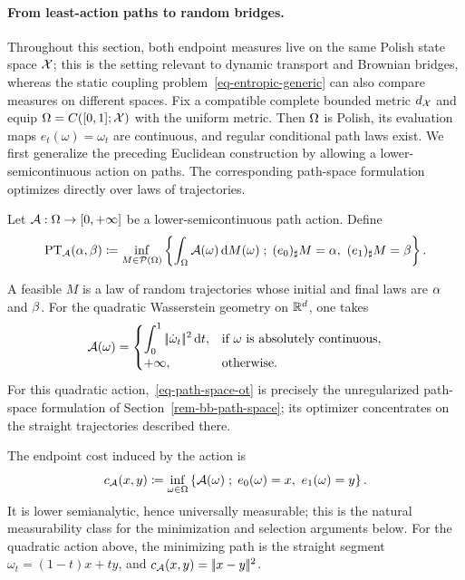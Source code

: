 \paragraph{From least-action paths to random bridges.}

Throughout this section, both endpoint measures live on the same Polish state space $\mathcal{X}$; this is the setting relevant to dynamic transport and Brownian bridges, whereas the static coupling problem~\eqref{eq-entropic-generic} can also compare measures on different spaces. Fix a compatible complete bounded metric $d_{\mathcal{X}}$ and equip $\Omega=C([0,1];\mathcal{X})$ with the uniform metric. Then $\Omega$ is Polish, its evaluation maps $e_t(\omega)=\omega_t$ are continuous, and regular conditional path laws exist. We first generalize the preceding Euclidean construction by allowing a lower-semicontinuous action on paths.
%
The corresponding path-space formulation optimizes directly over laws of trajectories.
\begin{defn}\label{def-path-space-transport}
Let $\mathcal{A}:\Omega\to[0,+\infty]$ be a lower-semicontinuous path action. Define
\begin{equation}\label{eq-path-space-ot}
	\operatorname{PT}_{\mathcal{A}}(\alpha,\beta)
	\coloneqq
	\inf_{M\in\mathcal{P}(\Omega)}
	\left\{ 
		\int_\Omega \mathcal{A}(\omega)\,\mathrm{d} M(\omega)
	 \;;\; 
		(e_0)_\sharp M=\alpha,\ (e_1)_\sharp M=\beta
	 \right\}.
\end{equation}
\end{defn}
A feasible $M$ is a law of random trajectories whose initial and final laws are $\alpha$ and $\beta$.
For the quadratic Wasserstein geometry on $\mathbb{R}^d$, one takes
\[
	\mathcal{A}(\omega)=
	\begin{cases}
	\displaystyle \int_0^1 |\!| \dot\omega_t |\!|^2\,\mathrm{d} t,
		& \text{if }\omega\text{ is absolutely continuous},\\[.4em]
	+\infty, & \text{otherwise}.
	\end{cases}
\]
For this quadratic action,~\eqref{eq-path-space-ot} is precisely the unregularized path-space formulation of Section~\ref{rem-bb-path-space}; its optimizer concentrates on the straight trajectories described there.

The endpoint cost induced by the action is
\begin{equation}\label{eq-path-action-endpoint-cost}
	c_{\mathcal{A}}(x,y)
	\coloneqq
	\inf_{\omega\in\Omega}
	\left\{ \mathcal{A}(\omega) \;;\; e_0(\omega)=x,\ e_1(\omega)=y \right\}.
\end{equation}
It is lower semianalytic, hence universally measurable; this is the natural measurability class for the minimization and selection arguments below.
For the quadratic action above, the minimizing path is the straight segment
$\omega_t=(1-t)x+ty$, and $c_{\mathcal{A}}(x,y)=|\!| x-y |\!|^2$.

